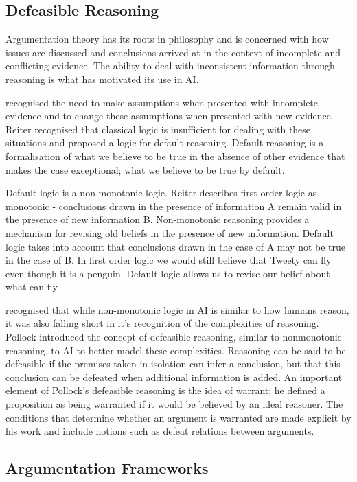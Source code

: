 \subsection{Defeasible Reasoning}

Argumentation theory has its roots in philosophy and is concerned with how issues are discussed and conclusions arrived at in the context of incomplete and conflicting evidence. The ability to deal with inconsistent information through reasoning is what has motivated its use in AI. 

\cite{reiter1980logic} recognised the need to make assumptions when presented with incomplete evidence and to change these assumptions when presented with new evidence. Reiter recognised that classical logic is insufficient for dealing with these situations and proposed a logic for default reasoning. Default reasoning is a formalisation of what we believe to be true in the absence of other evidence that makes the case exceptional; what we believe to be true by default.

Default logic is a non-monotonic logic. Reiter describes first order logic as monotonic - conclusions drawn in the presence of information A remain valid in the presence of new information B. Non-monotonic reasoning provides a mechanism for revising old beliefs in the presence of new information. Default logic takes into account that conclusions drawn in the case of A may not be true in the case of B. In first order logic we would still believe that Tweety can fly even though it is a penguin. Default logic allows us to revise our belief about what can fly.

\cite{pollock1987defeasible} recognised that while non-monotonic logic in AI is similar to how humans reason, it was also falling short in it’s recognition of the complexities of reasoning. Pollock introduced the concept of defeasible reasoning, similar to nonmonotonic reasoning, to AI to better model these complexities. Reasoning can be said to be defeasible if the premises taken in isolation can infer a conclusion, but that this conclusion can be defeated when additional information is added. An important element of Pollock's defeasible reasoning is the idea of warrant; he defined a proposition as being warranted if it would be believed by an ideal reasoner. The conditions that determine whether an argument is warranted are made explicit by his work and include notions such as defeat relations between arguments.

\subsection{Argumentation Frameworks}

